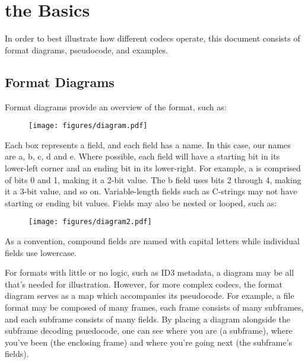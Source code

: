 
\chapter{the Basics}

In order to best illustrate how different codecs operate,
this document consists of format diagrams, pseudocode,
and examples.

\section{Format Diagrams}

Format diagrams provide an overview of the format, such as:
\begin{figure}[h]
  \texttt{[image: figures/diagram.pdf]}
\end{figure}
\par
\noindent
Each box represents a field, and each field has a name.
In this case, our names are a, b, c, d and e.
Where possible, each field will have a starting bit
in its lower-left corner and an ending bit in its lower-right.
For example, a is comprised of bits 0 and 1, making it a 2-bit value.
The b field uses bits 2 through 4, making it a 3-bit value, and so on.
Variable-length fields such as C-strings may not have starting or ending
bit values.
Fields may also be nested or looped, such as:
\begin{figure}[h]
  \texttt{[image: figures/diagram2.pdf]}
\end{figure}
\par
\noindent
As a convention, compound fields are named with capital letters
while individual fields use lowercase.
\par
For formats with little or no logic, such as ID3 metadata,
a diagram may be all that's needed for illustration.
However, for more complex codecs, the format diagram serves as a map
which accompanies its pseudocode.
For example, a file format may be composed of many frames, each frame
consists of many subframes, and each subframe consists of many fields.
By placing a diagram alongside the subframe decoding psuedocode,
one can see where you are (a subframe),
where you've been (the enclosing frame)
and where you're going next (the subframe's fields).

